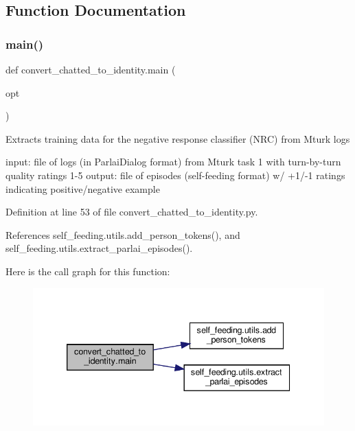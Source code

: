 \subsection{Function Documentation}
\mbox{\label{namespaceconvert__chatted__to__identity_ab4644532a7d6d29c252859898f3f8feb}} 
\subsubsection{\texorpdfstring{main()}{main()}}
{\footnotesize\ttfamily def convert\+\_\+chatted\+\_\+to\+\_\+identity.\+main (\begin{DoxyParamCaption}\item[{}]{opt }\end{DoxyParamCaption})}

\begin{DoxyVerb}Extracts training data for the negative response classifier (NRC) from Mturk logs

input: file of logs (in ParlaiDialog format) from Mturk task 1 with turn-by-turn
    quality ratings 1-5
output: file of episodes (self-feeding format) w/ +1/-1 ratings indicating
    positive/negative example
\end{DoxyVerb}
 

Definition at line 53 of file convert\+\_\+chatted\+\_\+to\+\_\+identity.\+py.



References self\+\_\+feeding.\+utils.\+add\+\_\+person\+\_\+tokens(), and self\+\_\+feeding.\+utils.\+extract\+\_\+parlai\+\_\+episodes().

Here is the call graph for this function\+:
\nopagebreak
\begin{figure}[H]
\begin{center}
\leavevmode
\includegraphics[width=339pt]{namespaceconvert__chatted__to__identity_ab4644532a7d6d29c252859898f3f8feb_cgraph}
\end{center}
\end{figure}
\mbox{\label{namespaceconvert__chatted__to__identity_afcf3d0107d9de04c08b48929cf9d1a98}} 
